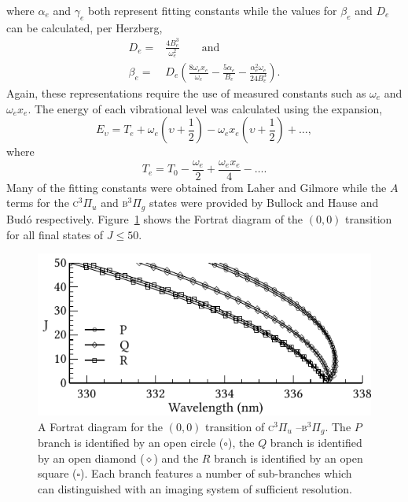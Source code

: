 where $\alpha_e$ and $\gamma_e$ both represent fitting constants while the
values for $\beta_e$ and $D_e$ can be calculated, per Herzberg,
\begin{align}
  D_e     = & \frac{4B_e ^3}{\omega_e ^2} \qquad \mathrm{and} \\
  \beta_e = & D_e \left(\frac{8\omega_ex_e}{\omega_e} - \frac{5\alpha_e}{B_e}
                        - \frac{\alpha_e ^2\omega_e}{24B_e ^3}\right).
\end{align}
Again, these representations require the use of measured constants such as
$\omega_e$ and $\omega_ex_e$. The energy of each vibrational level was
calculated using the expansion,
\begin{equation}
  E_\upsilon = T_e + \omega_e\left(\upsilon + \frac{1}{2}\right)
               - \omega_ex_e\left(\upsilon + \frac{1}{2}\right) + \ldots,
\end{equation}
where
\begin{equation}
  T_e = T_0 - \frac{\omega_e}{2} + \frac{\omega_ex_e}{4} - \ldots.
\end{equation}
Many of the fitting constants were obtained from Laher and Gilmore
\cite{Laher1990} while the $A$ terms for the \textsc{c}$^3\Pi_u$ and
\textsc{b}$^3\Pi_g$ states were provided by Bullock and Hause \cite{Bullock1971}
and Bud\'o respectively. Figure~\ref{fig:fortrat} shows the Fortrat diagram of
the $(0,0)$ transition for all final states of $J \leq 50$.
\begin{figure}
  \centering
  \includegraphics{./chapters/nasa/figures/fortrat.pdf}

  \caption{A Fortrat diagram for the $(0,0)$ transition of \textsc{c}$^3\Pi_u$
    --\textsc{b}$^3\Pi_g$. The $P$ branch is identified by an
    open circle ({\large $\circ$}), the $Q$ branch is identified by an open diamond
    ({\large $\diamond$}) and the $R$ branch is identified by an open square
    ({$\square$}). Each branch features a number of sub-branches which can
    distinguished with an imaging system of sufficient resolution.}
  \label{fig:fortrat}
\end{figure}
